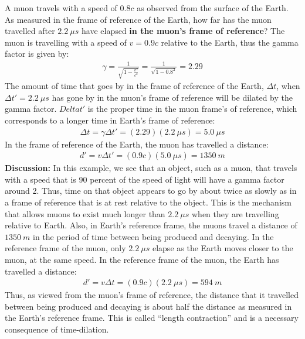 \begin{example}{A muon travels with a speed of $0.8c$ as observed from the surface of the Earth. As measured in the frame of reference of the Earth, how far has the muon travelled after $\SI{2.2}{\mu s}$ have elapsed \textbf{in the muon's frame of reference}?}
The muon is travelling with a speed of $v=0.9c$ relative to the Earth, thus the gamma factor is given by:
\begin{align*}
\gamma = \frac{1}{\sqrt{1-\frac{v^2}{c^2}}} =\frac{1}{\sqrt{1-0.8^2}}=2.29
\end{align*}
The amount of time that goes by in the frame of reference of the Earth, $\Delta t$, when $\Delta t'=\SI{2.2}{\mu s}$ has gone by in the muon's frame of reference will be dilated by the gamma factor. $Delta t'$ is the proper time in the muon frame's of reference, which corresponds to a longer time in Earth's frame of reference:
\begin{align*}
\Delta t = \gamma \Delta t' = (2.29)(\SI{2.2}{\mu s})=\SI{5.0}{\mu s}
\end{align*}
In the frame of reference of the Earth, the muon has travelled a distance:
\begin{align*}
d' = v\Delta t'=(0.9c)(\SI{5.0}{\mu s})=\SI{1350}{m}
\end{align*}
\textbf{Discussion: }In this example, we see that an object, such as a muon, that travels with a speed that is 90 percent of the speed of light will have a gamma factor around 2. Thus, time on that object appears to go by about twice as slowly as in a frame of reference that is at rest relative to the object. This is the mechanism that allows muons to exist much longer than $\SI{2.2}{\mu s}$ when they are travelling relative to Earth. Also, in Earth's reference frame, the muons travel a distance of $\SI{1350}{m}$ in the period of time between being produced and decaying. In the reference frame of the muon, only $\SI{2.2}{\mu s}$ elapse as the Earth moves closer to the muon, at the same speed. In the reference frame of the muon, the Earth has travelled a distance:
\begin{align*}
d' = v\Delta t=(0.9c)(\SI{2.2}{\mu s})=\SI{594}{m}
\end{align*}
Thus, as viewed from the muon's frame of reference, the distance that it travelled between being produced and decaying is about half the distance as measured in the Earth's reference frame. This is called ``length contraction'' and is a necessary consequence of time-dilation. 
\end{example}

